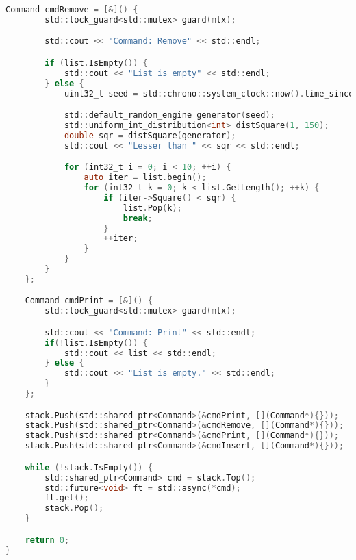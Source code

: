 \begin{lstlisting}[language=C]
    Command cmdRemove = [&]() {
        std::lock_guard<std::mutex> guard(mtx);

        std::cout << "Command: Remove" << std::endl;

        if (list.IsEmpty()) {
            std::cout << "List is empty" << std::endl;
        } else {
            uint32_t seed = std::chrono::system_clock::now().time_since_epoch().count();

            std::default_random_engine generator(seed);
            std::uniform_int_distribution<int> distSquare(1, 150);
            double sqr = distSquare(generator);
            std::cout << "Lesser than " << sqr << std::endl;

            for (int32_t i = 0; i < 10; ++i) {
                auto iter = list.begin();
                for (int32_t k = 0; k < list.GetLength(); ++k) {
                    if (iter->Square() < sqr) {
                        list.Pop(k);
                        break;
                    }
                    ++iter;
                }
            }
        }
    };

    Command cmdPrint = [&]() {
        std::lock_guard<std::mutex> guard(mtx);

        std::cout << "Command: Print" << std::endl;
        if(!list.IsEmpty()) {
            std::cout << list << std::endl;
        } else {
            std::cout << "List is empty." << std::endl;
        }
    };

    stack.Push(std::shared_ptr<Command>(&cmdPrint, [](Command*){}));
    stack.Push(std::shared_ptr<Command>(&cmdRemove, [](Command*){}));
    stack.Push(std::shared_ptr<Command>(&cmdPrint, [](Command*){}));
    stack.Push(std::shared_ptr<Command>(&cmdInsert, [](Command*){}));

    while (!stack.IsEmpty()) {
        std::shared_ptr<Command> cmd = stack.Top();
        std::future<void> ft = std::async(*cmd);
        ft.get();
        stack.Pop();
    }

    return 0;
}

\end{lstlisting}


